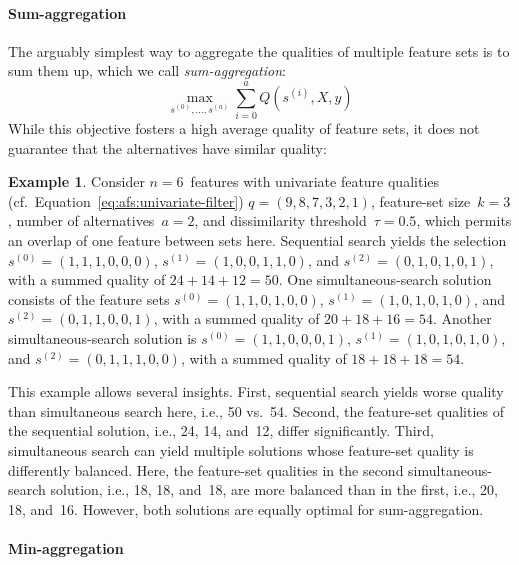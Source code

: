 \documentclass{article}
\theoremstyle{definition}
\newtheorem{example}{Example}
\begin{document}
\paragraph{Sum-aggregation}

The arguably simplest way to aggregate the qualities of multiple feature sets is to sum them up, which we call \emph{sum-aggregation}:
%
\begin{equation}
	\max_{s^{(0)}, \dots, s^{(a)}} \sum_{i=0}^a Q(s^{(i)},X,y)
	\label{eq:afs:afs-simultaneous-sum-objective}
\end{equation}
%
While this objective fosters a high average quality of feature sets, it does not guarantee that the alternatives have similar quality:
%
\begin{example}
Consider $n=6$~features with univariate feature qualities (cf.~Equation~\ref{eq:afs:univariate-filter}) $q = (9,8,7,3,2,1)$, feature-set size~$k=3$, number of alternatives~$a=2$, and dissimilarity threshold~$\tau = 0.5$, which permits an overlap of one feature between sets here.
Sequential search yields the selection $s^{(0)} = (1,1,1,0,0,0)$, $s^{(1)} = (1,0,0,1,1,0)$, and $s^{(2)} = (0,1,0,1,0,1)$, with a summed quality of $24+14+12=50$.
One simultaneous-search solution consists of the feature sets $s^{(0)} = (1,1,0,1,0,0)$, $s^{(1)} = (1,0,1,0,1,0)$, and $s^{(2)} = (0,1,1,0,0,1)$, with a summed quality of $20+18+16=54$.
Another simultaneous-search solution is $s^{(0)} = (1,1,0,0,0,1)$, $s^{(1)} = (1,0,1,0,1,0)$, and $s^{(2)} = (0,1,1,1,0,0)$, with a summed quality of $18+18+18=54$.
\label{ex:afs:sum-aggregation}
\end{example}
%
This example allows several insights.
First, sequential search yields worse quality than simultaneous search here, i.e., 50 vs.~54.
Second, the feature-set qualities of the sequential solution, i.e., 24, 14, and~12, differ significantly.
Third, simultaneous search can yield multiple solutions whose feature-set quality is differently balanced.
Here, the feature-set qualities in the second simultaneous-search solution, i.e., 18, 18, and~18, are more balanced than in the first, i.e., 20, 18, and~16.
However, both solutions are equally optimal for sum-aggregation.

\paragraph{Min-aggregation}
\end{document}

